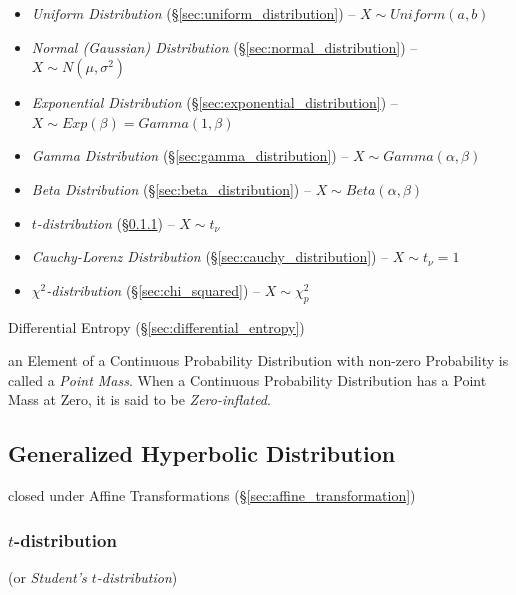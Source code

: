 \begin{itemize}
  \item \emph{Uniform Distribution} (\S\ref{sec:uniform_distribution}) --
    $X \sim Uniform(a,b)$
  \item \emph{Normal (Gaussian) Distribution} (\S\ref{sec:normal_distribution})
    -- $X \sim N(\mu, \sigma^2)$
  \item \emph{Exponential Distribution} (\S\ref{sec:exponential_distribution})
    -- $X \sim Exp(\beta) = Gamma(1, \beta)$
  \item \emph{Gamma Distribution} (\S\ref{sec:gamma_distribution})
    -- $X \sim Gamma(\alpha, \beta)$
  \item \emph{Beta Distribution} (\S\ref{sec:beta_distribution})
    -- $X \sim Beta(\alpha, \beta)$
  \item \emph{$t$-distribution} (\S\ref{sec:t_distribution})
    -- $X \sim t_\nu$
  \item \emph{Cauchy-Lorenz Distribution} (\S\ref{sec:cauchy_distribution})
    -- $X \sim t_\nu=1$
  \item \emph{$\chi^2$-distribution} (\S\ref{sec:chi_squared})
    -- $X \sim \chi^2_p$
\end{itemize}

Differential Entropy (\S\ref{sec:differential_entropy})

an Element of a Continuous Probability Distribution with non-zero Probability is
called a \emph{Point Mass}. When a Continuous Probability Distribution has a
Point Mass at Zero, it is said to be \emph{Zero-inflated}.



\subsection{Generalized Hyperbolic Distribution}
\label{sec:generalized_hyperbolic}

closed under Affine Transformations (\S\ref{sec:affine_transformation})



\subsubsection{$t$-distribution}\label{sec:t_distribution}

(or \emph{Student's $t$-distribution})

